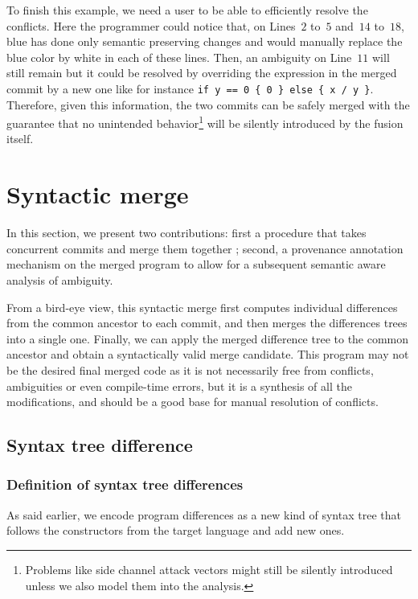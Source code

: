 \documentclass[a4paper,11pt]{article}
\begin{document}
To finish this example, we need a user to be able to efficiently
resolve the conflicts. Here the programmer could notice that, on
Lines~$2$ to~$5$ and~$14$ to~$18$, blue has done only semantic
preserving changes and would manually replace the blue color by white
in each of these lines. Then, an ambiguity on Line~$11$ will still
remain but it could be resolved by overriding the expression in the
merged commit by a new one like for instance
\lstinline$if y == 0 { 0 } else { x / y }$.
Therefore, given this information, the two commits
can be safely merged with the guarantee that no unintended
behavior\footnote{Problems like side channel attack vectors might still be silently introduced unless we also model them into the analysis.} will be silently introduced by the fusion itself.

\section{Syntactic merge}
\label{sec:syntactic-merge}

In this section, we present two contributions: first a procedure that
takes concurrent commits and merge them together ; second, a
provenance annotation mechanism on the merged program to allow for a
subsequent semantic aware analysis of ambiguity.

From a bird-eye view, this syntactic merge first computes individual
differences from the common ancestor to each commit, and then merges
the differences trees into a single one. Finally, we can apply the
merged difference tree to the common ancestor and obtain a
syntactically valid merge candidate. This program may not be the
desired final merged code as it is not necessarily free
from conflicts, ambiguities or even compile-time errors, but it is a synthesis of all the modifications, and should be a good base for manual resolution of conflicts.

\subsection{Syntax tree difference}

\subsubsection{Definition of syntax tree differences}
\label{sec:syntax_tree_def}
As said earlier, we encode program differences as a new kind of syntax
tree that follows the constructors from the target language and add
new ones.
\end{document}

